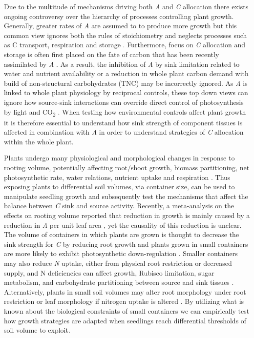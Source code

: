 \documentclass[a4paper]{article}\usepackage[]{graphicx}\usepackage[]{color}
\begin{document}
Due to the multitude of mechanisms driving both \textit{A} and \textit{C} allocation there exists ongoing controversy over the hierarchy of processes controlling plant growth.  Generally, greater rates of \textit{A} are assumed to to produce more growth but this common view ignores both the rules of stoichiometry and neglects processes such as C transport, respiration and storage \citep{korner2013growth}. Furthermore, focus on \textit{C} allocation and storage is often first placed on the fate of carbon that has been recently assimilated by \textit{A} \citep{atkin2015new}. As a result, the inhibition of \textit{A} by sink limitation related to water and nutrient availability or a reduction in whole plant carbon demand with build of non-structural carbohydrates (TNC) may be incorrectly ignored. As \textit{A} is linked to whole plant physiology by reciprocal controls, these top down views can ignore how source-sink interactions can override direct control of photosynthesis by light and CO\textsubscript{2} \citep{paul2001sink}. When testing how environmental controls affect plant growth it is therefore essential to understand how sink strength of component tissues is affected in combination with \textit{A} in order to understand strategies of \textit{C} allocation within the whole plant.

Plants undergo many physiological and morphological changes in response to rooting volume, potentially affecting root/shoot growth, biomass partitioning, net photosynthetic rate, water relations, nutrient uptake and respiration \citep[and references therein]{nesmith1998effect}. Thus exposing plants to differential soil volumes, via container size, can be used to manipulate seedling growth and subsequently test the mechanisms that affect the balance between \textit{C} sink and source activity.
Recently, a meta-analysis on the effects on rooting volume reported that reduction in growth is mainly caused by a reduction in \textit{A} per unit leaf area \citep{poorter2012pot}, yet the causality of this reduction is unclear. The volume of containers in which plants are grown is thought to decrease the sink strength for \textit{C} by reducing root growth and plants grown in small containers are more likely to exhibit photosynthetic down-regulation \citep{arp1991effects, mcconnaughay1991physical,gunderson1994photosynthetic, sage1994acclimation, maina2002intra,ronchi2006growth}. Smaller containers may also reduce \textit{N} uptake, either from physical root restriction or decreased supply, and N deficiencies can affect growth, Rubisco limitation, sugar metabolism, and carbohydrate partitioning between source and sink tissues \citep{stitt1991rising, hermans2006plants}. Alternatively, plants in small soil volumes may alter root morphology under root restriction \citep{krizek1985comparative} or leaf morphology if nitrogen uptake is altered \citep{reich1998photosynthesis}. By utilizing what is known about the biological constraints of small containers we can empirically test how growth strategies are adapted when seedlings reach differential thresholds of soil volume to exploit. 
\end{document}
